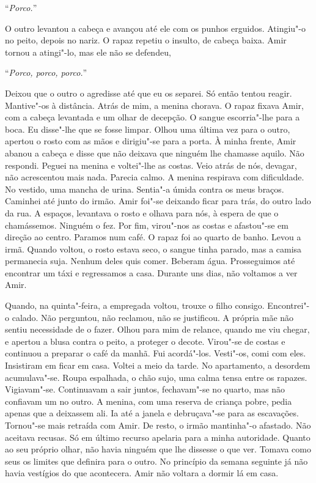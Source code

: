 ``\emph{Porco.}''

O outro levantou a cabeça e avançou até ele com os punhos erguidos.
Atingiu"-o no peito, depois no nariz. O rapaz repetiu o insulto, de
cabeça baixa. Amir tornou a atingi"-lo, mas ele não se defendeu,

``\emph{Porco, porco, porco.}''

Deixou que o outro o agredisse até que eu os separei. Só então tentou
reagir. Mantive"-os à distância. Atrás de mim, a menina chorava. O rapaz
fixava Amir, com a cabeça levantada e um olhar de decepção. O sangue
escorria"-lhe para a boca. Eu disse"-lhe que se fosse limpar. Olhou uma
última vez para o outro, apertou o rosto com as mãos e dirigiu"-se para
a porta. À minha frente, Amir abanou a cabeça e disse que não deixava
que ninguém lhe chamasse aquilo. Não respondi. Peguei na menina e
voltei"-lhe as costas. Veio atrás de nós, devagar, não acrescentou mais
nada. Parecia calmo. A menina respirava com dificuldade. No vestido, uma
mancha de urina. Sentia"-a úmida contra os meus braços. Caminhei até
junto do irmão. Amir foi"-se deixando ficar para trás, do outro lado da
rua. A espaços, levantava o rosto e olhava para nós, à espera de que o
chamássemos. Ninguém o fez. Por fim, virou"-nos as costas e afastou"-se
em direção ao centro. Paramos num café. O rapaz foi ao quarto de banho.
Levou a irmã. Quando voltou, o rosto estava seco, o sangue tinha parado,
mas a camisa permanecia suja. Nenhum deles quis comer. Beberam água.
Prosseguimos até encontrar um táxi e regressamos a casa. Durante uns
dias, não voltamos a ver Amir.

Quando, na quinta"-feira, a empregada voltou, trouxe o filho consigo.
Encontrei"-o calado. Não perguntou, não reclamou, não se justificou. A
própria mãe não sentiu necessidade de o fazer. Olhou para mim de
relance, quando me viu chegar, e apertou a blusa contra o peito, a
proteger o decote. Virou"-se de costas e continuou a preparar o
café da manhã. Fui acordá"-los. Vesti"-os, comi com eles. Insistiram
em ficar em casa. Voltei a meio da tarde. No apartamento, a desordem
acumulava"-se. Roupa espalhada, o chão sujo, uma calma tensa entre os
rapazes. Vigiavam"-se. Continuavam a sair juntos, fechavam"-se no
quarto, mas não confiavam um no outro. A menina, com uma reserva de
criança pobre, pedia apenas que a deixassem ali. Ia até a janela e
debruçava"-se para as escavações. Tornou"-se mais retraída com Amir. De
resto, o irmão mantinha"-o afastado. Não aceitava recusas. Só em último
recurso apelaria para a minha autoridade. Quanto ao seu próprio olhar,
não havia ninguém que lhe dissesse o que ver. Tomava como seus os
limites que definira para o outro. No princípio da semana seguinte já
não havia vestígios do que acontecera. Amir não voltara a dormir lá em
casa.

